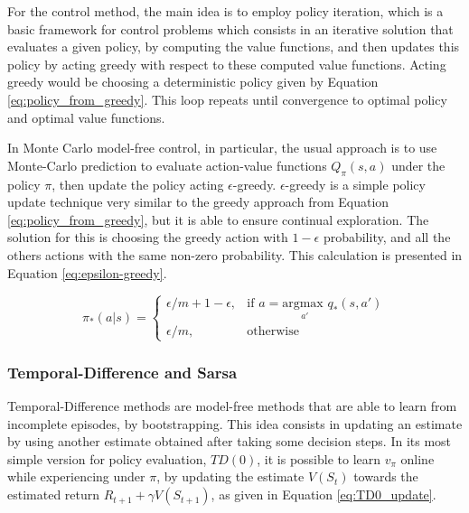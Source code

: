 For the control method, the main idea is to employ policy iteration, which is a basic framework for control problems which consists in an iterative solution that evaluates a given policy, by computing the value functions, and then updates this policy by acting greedy with respect to these computed value functions. Acting greedy would be choosing a deterministic policy given by Equation \eqref{eq:policy_from_greedy}. This loop repeats until convergence to optimal policy and optimal value functions.

In Monte Carlo model-free control, in particular, the usual approach is to use Monte-Carlo prediction to evaluate action-value functions $Q_{\pi}(s,a)$ under the policy $\pi$, then update the policy acting $\epsilon$-greedy. $\epsilon$-greedy is a simple policy update technique very similar to the greedy approach from Equation \eqref{eq:policy_from_greedy}, but it is able to ensure continual exploration. The solution for this is choosing the greedy action with $1-\epsilon$ probability, and all the others actions with the same non-zero probability. This calculation is presented in Equation \eqref{eq:epsilon-greedy}.

\begin{equation}
 \pi_*(a | s) = 
 \begin{cases}
    \epsilon/m + 1 - \epsilon ,& \text{if } a = \underset{a'}{\textrm{argmax }} q_*(s,a')\\
    \epsilon/m ,& \text{otherwise}
 \end{cases}
 \label{eq:epsilon-greedy}
\end{equation}



\subsubsection{Temporal-Difference and Sarsa}

Temporal-Difference methods \cite{Sutton1998, TDLearning} are model-free methods that are able to learn from incomplete episodes, by bootstrapping. This idea consists in updating an estimate by using another estimate obtained after taking some decision steps. In its most simple version for policy evaluation, $TD(0)$, it is possible to learn $v_{\pi}$ online while experiencing under $\pi$, by updating the estimate $V(S_t)$ towards the estimated return $R_{t+1} + \gamma V(S_{t+1})$, as given in Equation \eqref{eq:TD0_update}.

